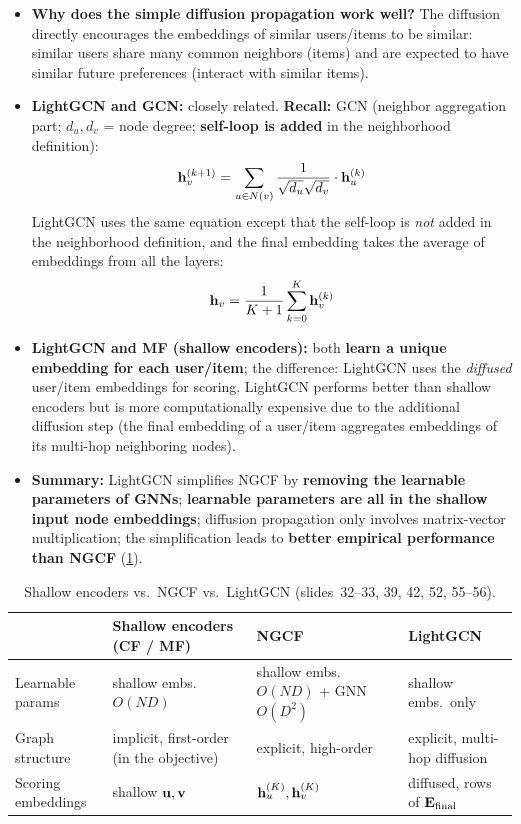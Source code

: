 \begin{itemize}
  \item \textbf{Why does the simple diffusion propagation work well?} The
    diffusion directly encourages the embeddings of similar users/items to be
    similar: similar users share many common neighbors (items) and are expected
    to have similar future preferences (interact with similar items).
  \item \textbf{LightGCN and GCN:} closely related. \textbf{Recall:} GCN
    (neighbor aggregation part; $d_u,d_v$ = node degree; \textbf{self-loop is
    added} in the neighborhood definition):
    \begin{equation}\label{eq:lec11-gcn-node}
      \mathbf{h}_v^{(k+1)}=\sum_{u\in N(v)}\frac{1}{\sqrt{d_u}\sqrt{d_v}}\cdot\mathbf{h}_u^{(k)}
    \end{equation}
    LightGCN uses the same equation except that the self-loop is \emph{not}
    added in the neighborhood definition, and the final embedding takes the
    average of embeddings from all the layers:
    \begin{equation}\label{eq:lec11-lgcn-node}
      \mathbf{h}_v=\frac{1}{K+1}\sum_{k=0}^{K}\mathbf{h}_v^{(k)}
    \end{equation}
  \item \textbf{LightGCN and MF (shallow encoders):} both \textbf{learn a
    unique embedding for each user/item}; the difference: LightGCN uses the
    \emph{diffused} user/item embeddings for scoring. LightGCN performs better
    than shallow encoders but is more computationally expensive due to the
    additional diffusion step (the final embedding of a user/item aggregates
    embeddings of its multi-hop neighboring nodes).
  \item \textbf{Summary:} LightGCN simplifies NGCF by \textbf{removing the
    learnable parameters of GNNs}; \textbf{learnable parameters are all in the
    shallow input node embeddings}; diffusion propagation only involves
    matrix-vector multiplication; the simplification leads to \textbf{better
    empirical performance than NGCF} (\cref{tab:lec11-compare}).
\end{itemize}

\begin{table}[htbp]
  \centering\small
  \caption{Shallow encoders vs.\ NGCF vs.\ LightGCN (slides~32--33, 39, 42,
  52, 55--56).}
  \label{tab:lec11-compare}
  \begin{tabularx}{\linewidth}{@{}l>{\raggedright\arraybackslash}X
      >{\raggedright\arraybackslash}X>{\raggedright\arraybackslash}X@{}}
    \toprule
    & Shallow encoders (CF / MF) & NGCF & LightGCN\\
    \midrule
    Learnable params & shallow embs.\ $O(ND)$
      & shallow embs.\ $O(ND)$ + GNN $O(D^2)$ & shallow embs.\ only\\
    Graph structure & implicit, first-order (in the objective)
      & explicit, high-order & explicit, multi-hop diffusion\\
    Scoring embeddings & shallow $\mathbf{u},\mathbf{v}$ & $\mathbf{h}_u^{(K)},\mathbf{h}_v^{(K)}$
      & diffused, rows of $\mathbf{E}_{\mathrm{final}}$\\
    \bottomrule
  \end{tabularx}
\end{table}

